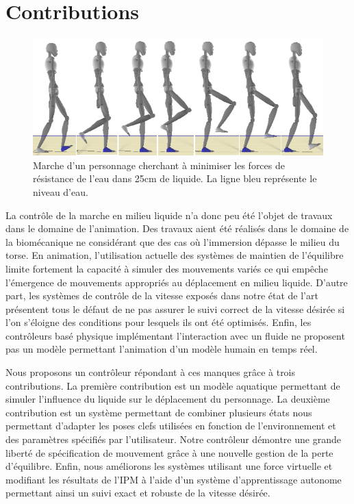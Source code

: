\documentclass[runningheads,a4paper]{llncs}
\begin{document}
\section{Contributions}
\label{sec:overview}


\begin{figure}[h]
\centering
\includegraphics[scale=0.6]{strips/min_drag_25cm.png}
\caption{Marche d'un personnage cherchant à minimiser les forces de résistance de l'eau dans 25cm de liquide. La ligne bleu représente le niveau d'eau.}
\label{fig:min_drag_25}
\end{figure}


La contrôle de la marche en milieu liquide n'a donc peu été l'objet de travaux dans le domaine de l'animation.  Des travaux aient été réalisés dans le domaine de la biomécanique ne considérant que des cas où l'immersion dépasse le milieu du torse. En animation, l'utilisation actuelle des systèmes de maintien de l'équilibre limite fortement la capacité à simuler des mouvements variés ce qui empêche l'émergence de mouvements appropriés au déplacement en milieu liquide. D'autre part, les systèmes de contrôle de la vitesse exposés dans notre état de l'art présentent tous  le défaut de ne pas assurer le suivi correct de la vitesse désirée si l'on s'éloigne des conditions pour lesquels ils ont été optimisés. Enfin, les contrôleurs basé physique implémentant l'interaction avec un fluide ne proposent pas un modèle permettant l'animation d'un modèle humain en temps réel.

Nous proposons un contrôleur répondant à ces manques grâce à trois contributions. La première contribution est un modèle aquatique permettant de simuler l'influence du liquide sur le déplacement du personnage. La deuxième contribution est un système permettant de combiner plusieurs états nous permettant d'adapter les poses clefs utilisées en fonction de l'environnement et des paramètres spécifiés par l'utilisateur. Notre contrôleur démontre une grande liberté de spécification de mouvement grâce à une nouvelle gestion de la perte d'équilibre. Enfin, nous améliorons les systèmes utilisant une force virtuelle et modifiant les résultats de l'IPM à l'aide d'un système d'apprentissage autonome permettant ainsi un suivi exact et robuste de la vitesse désirée. 
\end{document}
